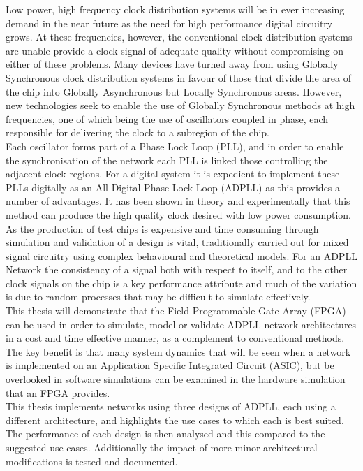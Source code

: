 \documentclass[11pt,english,british]{report}
\begin{document}
Low power, high frequency clock distribution systems will be in ever increasing demand in the near future as the need for high performance digital circuitry grows. At these frequencies, however, the conventional clock distribution systems are unable provide a clock signal of adequate quality without compromising on either of these problems. Many devices have turned away from using Globally Synchronous clock distribution systems in favour of those that divide the area of the chip into Globally Asynchronous but Locally Synchronous areas. However, new technologies seek to enable the use of Globally Synchronous methods at high frequencies, one of which being the use of oscillators coupled in phase, each responsible for delivering the clock to a subregion of the chip.\\
Each oscillator forms part of a Phase Lock Loop (PLL), and in order to enable the synchronisation of the network each PLL is linked those controlling the adjacent clock regions. For a digital system it is expedient to implement these PLLs digitally as an All-Digital Phase Lock Loop (ADPLL) as this provides a number of advantages. It has been shown in theory and experimentally that this method can produce the high quality clock desired with low power consumption.\\
As the production of test chips is expensive and time consuming through simulation and validation of a design is vital, traditionally carried out for mixed signal circuitry using complex behavioural and theoretical models. For an ADPLL Network the consistency of a signal both with respect to itself, and to the other clock signals on the chip is a key performance attribute and much of the variation is due to random processes that may be difficult to simulate effectively.\\
This thesis will demonstrate that the Field Programmable Gate Array (FPGA) can be used in order to simulate, model or validate ADPLL network architectures in a cost and time effective manner, as a complement to conventional methods. The key benefit is that many system dynamics that will be seen when a network is implemented on an Application Specific Integrated Circuit (ASIC), but be overlooked in software simulations can be examined in the hardware simulation that an FPGA provides.\\
This thesis implements networks using three designs of ADPLL, each using a different architecture, and highlights the use cases to which each is best suited. The performance of each design is then analysed and this compared to the suggested use cases. Additionally the impact of more minor architectural modifications is tested and documented.
\end{document}
